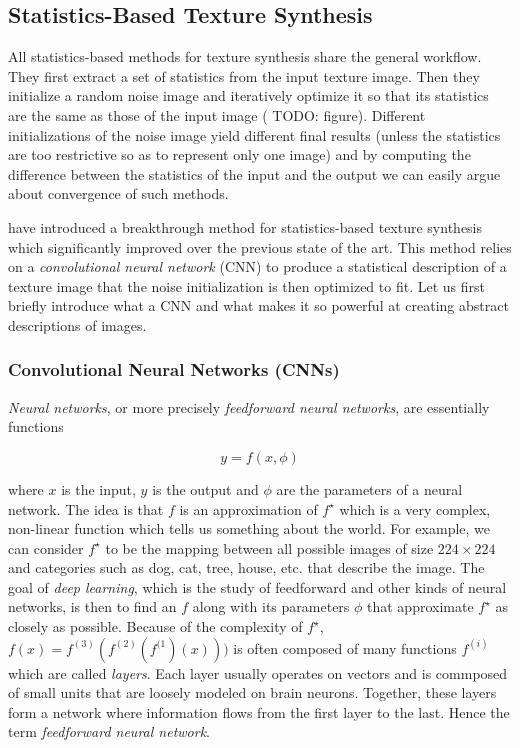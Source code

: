\subsection{Statistics-Based Texture Synthesis}
\label{section:background-texture_synthesis-statistics_based}

All statistics-based methods for texture synthesis share the general workflow. They first extract a set of statistics from the input texture image. Then they initialize a random noise image and iteratively optimize it so that its statistics are the same as those of the input image ({\color{red} TODO: figure}). Different initializations of the noise image yield different final results (unless the statistics are too restrictive so as to represent only one image) and by computing the difference between the statistics of the input and the output we can easily argue about convergence of such methods.

\citet{Gatys2015} have introduced a breakthrough method for statistics-based texture synthesis which significantly improved over the previous state of the art. This method relies on a \textit{convolutional neural network} (CNN) to produce a statistical description of a texture image that the noise initialization is then optimized to fit. Let us first briefly introduce what a CNN and what makes it so powerful at creating abstract descriptions of images.

\subsubsection{Convolutional Neural Networks (CNNs)}
\label{section:background-texture_synthesis-statistics_based-cnns}

\textit{Neural networks}, or more precisely \textit{feedforward neural networks}, are essentially functions

\begin{equation}
    \label{eq:neural_network}
    y = f(x, \phi)
\end{equation}

where \(x\) is the input, \(y\) is the output and \(\phi\) are the parameters of a neural network. The idea is that \(f\) is an approximation of \(f^\star\) which is a very complex, non-linear function which tells us something about the world. For example, we can consider \(f^\star\) to be the mapping between all possible images of size \(224 \times 224\) and categories such as dog, cat, tree, house, etc. that describe the image. The goal of \textit{deep learning}, which is the study of feedforward and other kinds of neural networks, is then to find an \(f\) along with its parameters \(\phi\) that approximate \(f^\star\) as closely as possible. Because of the complexity of \(f^\star\), \(f(x) = f^{(3)}(f^{(2)}(f^{(1})(x)))\) is often composed of many functions \(f^{(i)}\) which are called \textit{layers}. Each layer usually operates on vectors and is commposed of small units that are loosely modeled on brain neurons. Together, these layers form a network where information flows from the first layer to the last. Hence the term \textit{feedforward neural network}.

